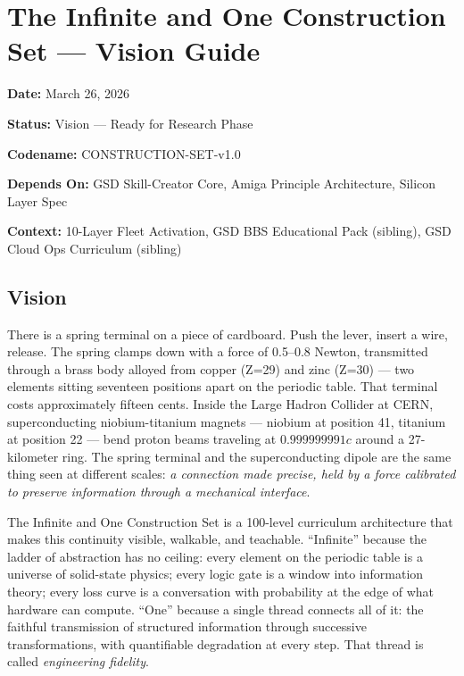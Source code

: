 \documentclass[11pt,letterpaper]{article}
\newcommand{\stageheader}[2]{%
  \noindent\colorbox{#2}{\makebox[\dimexpr\textwidth-2\fboxsep\relax][l]{%
    \textcolor{white}{\bfseries\sffamily\hspace{6pt}#1\hspace{6pt}}}}%
  \vspace{0.5em}\par%
}
\newcommand{\metafield}[2]{\textbf{\sffamily #1} #2\par}
\begin{document}
\tableofcontents
\newpage

\stageheader{STAGE 1 --- VISION DOCUMENT}{primary}

\section{The Infinite and One Construction Set --- Vision Guide}

\metafield{Date:}{March 26, 2026}
\metafield{Status:}{Vision --- Ready for Research Phase}
\metafield{Codename:}{CONSTRUCTION-SET-v1.0}
\metafield{Depends On:}{GSD Skill-Creator Core, Amiga Principle Architecture, Silicon Layer Spec}
\metafield{Context:}{10-Layer Fleet Activation, GSD BBS Educational Pack (sibling), GSD Cloud Ops Curriculum (sibling)}

\subsection{Vision}

There is a spring terminal on a piece of cardboard. Push the lever, insert a wire, release.
The spring clamps down with a force of 0.5--0.8 Newton, transmitted through a brass body
alloyed from copper (Z=29) and zinc (Z=30) --- two elements sitting seventeen positions apart
on the periodic table. That terminal costs approximately fifteen cents. Inside the Large Hadron
Collider at CERN, superconducting niobium-titanium magnets --- niobium at position 41, titanium
at position 22 --- bend proton beams traveling at $0.999999991c$ around a 27-kilometer ring.
The spring terminal and the superconducting dipole are the same thing seen at different scales:
\textit{a connection made precise, held by a force calibrated to preserve information through a
mechanical interface}.

The Infinite and One Construction Set is a 100-level curriculum architecture that makes this
continuity visible, walkable, and teachable. ``Infinite'' because the ladder of abstraction has
no ceiling: every element on the periodic table is a universe of solid-state physics; every
logic gate is a window into information theory; every loss curve is a conversation with
probability at the edge of what hardware can compute. ``One'' because a single thread connects
all of it: the faithful transmission of structured information through successive transformations,
with quantifiable degradation at every step. That thread is called \textit{engineering fidelity}.
\end{document}
